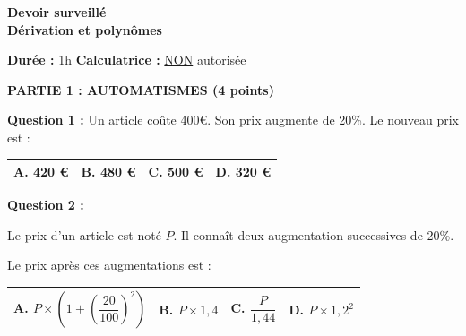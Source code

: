 \documentclass[12pt,a4paper]{exam}
\begin{document}
\begin{center}
    \Large\textbf{Devoir surveillé\\Dérivation et polynômes}
\end{center}

\vspace{0.3cm}

\noindent
\textbf{Durée :} 1h \hfill
\textbf{Calculatrice :} \underline{NON} autorisée

\vspace{0.5cm}

\noindent
\textbf{\large{PARTIE 1 : AUTOMATISMES (4 points)}}

\vspace{10pt}

\textbf{Question 1 :}
\vspace{5pt}
Un article coûte 400€. Son prix augmente de 20\%. Le nouveau prix est : 

\begin{center}
    \renewcommand{\arraystretch}{3}
    \begin{tabular}{|m{3.4cm}|m{3.4cm}|m{3.4cm}|m{3.4cm}|}
    \hline
    \centering \vspace{-0.3cm} \textbf{A.} 420 € & 
    \centering \vspace{-0.3cm} \textbf{B.} 480 € & 
    \centering \vspace{-0.3cm} \textbf{C.} 500 € & 
    \centering \vspace{-0.3cm} \textbf{D.} 320 € \tabularnewline
    \hline
    \end{tabular}
\end{center}

\vspace{10pt}

\textbf{Question 2 :}
\vspace{5pt}

Le prix d'un article est noté $P$. Il connaît deux augmentation successives de 20\%.

Le prix après ces augmentations est :

\noindent
\begin{center}
    \renewcommand{\arraystretch}{3}
    \begin{tabular}{|m{4.5cm}|m{3.4cm}|m{3.2cm}|m{3.4cm}|}
    \hline
    \centering \vspace{-0.3cm} \textbf{A.} $P \times \left(1+\left(\dfrac{20}{100}\right)^2\right)$ & 
    \centering \vspace{-0.3cm} \textbf{B.} $P \times 1,4$ & 
    \centering \vspace{-0.3cm} \textbf{C.} $\dfrac{P}{1,44}$ & 
    \centering \vspace{-0.3cm} \textbf{D.} $P \times 1,2^2$ \tabularnewline
    \hline
    \end{tabular}
\end{center}
\end{document}

